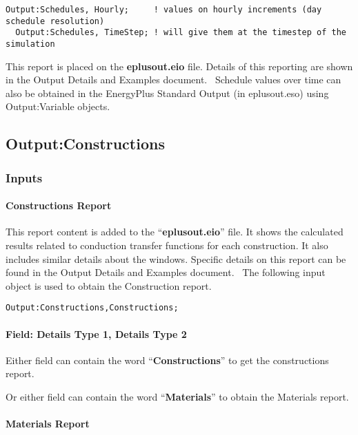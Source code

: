 \begin{lstlisting}
Output:Schedules, Hourly;     ! values on hourly increments (day schedule resolution)
  Output:Schedules, TimeStep; ! will give them at the timestep of the simulation
\end{lstlisting}

This report is placed on the \textbf{eplusout.eio} file. Details of this reporting are shown in the Output Details and Examples document.~ Schedule values over time can also be obtained in the EnergyPlus Standard Output (in eplusout.eso) using Output:Variable objects.

\subsection{Output:Constructions}\label{outputconstructions}

\subsubsection{Inputs}\label{inputs-3-030}

\paragraph{Constructions Report}\label{constructions-report}

This report content is added to the ``\textbf{eplusout.eio}'' file. It shows the calculated results related to conduction transfer functions for each construction. It also includes similar details about the windows. Specific details on this report can be found in the Output Details and Examples document.~ The following input object is used to obtain the Construction report.

\begin{lstlisting}
Output:Constructions,Constructions;
\end{lstlisting}

\paragraph{Field: Details Type 1, Details Type 2}\label{field-details-type-1-details-type-2}

Either field can contain the word ``\textbf{Constructions}'' to get the constructions report.

Or either field can contain the word ``\textbf{Materials}'' to obtain the Materials report.

\paragraph{Materials Report}\label{materials-report}

